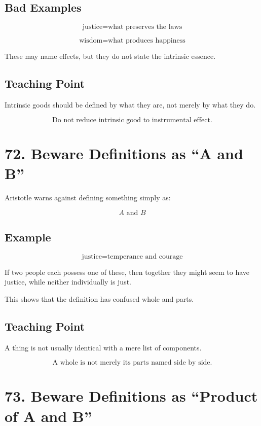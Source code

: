 \documentclass[12pt]{article}
\begin{document}
\subsection*{Bad Examples}

\[
\text{justice} = \text{what preserves the laws}
\]

\[
\text{wisdom} = \text{what produces happiness}
\]

These may name effects, but they do not state the intrinsic essence.

\subsection*{Teaching Point}

Intrinsic goods should be defined by what they are, not merely by what they do.

\[
\boxed{
\text{Do not reduce intrinsic good to instrumental effect.}
}
\]

\section*{72. Beware Definitions as ``A and B''}

Aristotle warns against defining something simply as:

\[
A \text{ and } B
\]

\subsection*{Example}

\[
\text{justice} = \text{temperance and courage}
\]

If two people each possess one of these, then together they might seem to have
justice, while neither individually is just.

This shows that the definition has confused whole and parts.

\subsection*{Teaching Point}

A thing is not usually identical with a mere list of components.

\[
\boxed{
\text{A whole is not merely its parts named side by side.}
}
\]

\section*{73. Beware Definitions as ``Product of A and B''}
\end{document}
